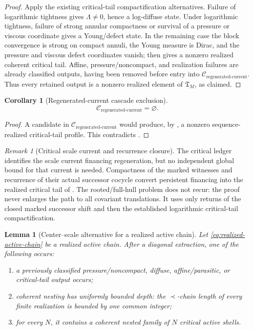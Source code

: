 \documentclass[11pt]{amsart}
\numberwithin{equation}{section}
\theoremstyle{plain}
\newtheorem{lemma}[lemma]{Lemma}
\newtheorem{corollary}[corollary]{Corollary}
\theoremstyle{definition}
\theoremstyle{remark}
\newtheorem{remark}[remark]{Remark}
\newcommand{\Cregen}{\mathcal C_{\mathrm{regenerated\text{-}current}}}
\newcommand{\Tcrit}{\mathfrak T_M}
\begin{document}
\begin{proof}
Apply the existing critical-tail compactification alternatives.  Failure of
logarithmic tightness gives \(\Lambda\ne0\), hence a log-diffuse state.
Under logarithmic tightness, failure of strong annular compactness or survival
of a pressure or viscous coordinate gives a Young/defect state.  In the
remaining case the block convergence is strong on compact annuli, the Young
measure is Dirac, and the pressure and viscous defect coordinates vanish;
 then gives a nonzero realized
coherent critical tail.  Affine, pressure/noncompact, and realization failures
are already classified outputs, having been removed before entry into
\(\Cregen\).  Thus every retained output is a nonzero realized element of
\(\Tcrit\), as claimed.
\end{proof}

\begin{corollary}[Regenerated-current cascade exclusion]
\label{cor:regenerated-current-cascade-exclusion}
\[
 \Cregen=\varnothing.
\]
\end{corollary}

\begin{proof}
A candidate in \(\Cregen\) would produce, by
, a nonzero sequence-realized
critical-tail profile.  This contradicts
.
\end{proof}

\begin{remark}[Critical scale current and recurrence closure]
\label{rem:exact-missing-critical-regeneration-charge}
The critical ledger identifies the scale current financing regeneration, but
no independent global bound for that current is needed.  Compactness of the
marked witnesses and recurrence of their actual successor cocycle convert
persistent financing into the realized critical tail of
.  The rooted/full-hull problem
does not recur: the proof never enlarges the path to all covariant
translations.  It uses only returns of the closed marked successor shift and
then the established logarithmic critical-tail compactification.
\end{remark}

\begin{lemma}[Center--scale alternative for a realized active chain]
\label{lem:active-chain-center-scale-alternative}
Let \eqref{eq:realized-active-chain} be a realized active chain.  After a
diagonal extraction, one of the following occurs:
\begin{enumerate}[label=\textup{(\roman*)}]
 \item a previously classified pressure/noncompact, diffuse, affine/parasitic,
 or critical-tail output occurs;
 \item coherent nesting has uniformly bounded depth: the \(\prec\)-chain
 length of every finite realization is bounded by one common integer;
 \item for every \(N\), it contains a coherent nested family of \(N\)
 critical active shells.
\end{enumerate}
\end{lemma}
\end{document}
